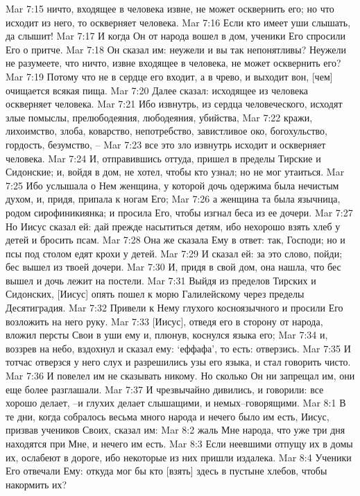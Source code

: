 Mar 7:15  ничто, входящее в человека извне, не может осквернить его; но что исходит из него, то оскверняет человека.
Mar 7:16  Если кто имеет уши слышать, да слышит!
Mar 7:17  И когда Он от народа вошел в дом, ученики Его спросили Его о притче.
Mar 7:18  Он сказал им: неужели и вы так непонятливы? Неужели не разумеете, что ничто, извне входящее в человека, не может осквернить его?
Mar 7:19  Потому что не в сердце его входит, а в чрево, и выходит вон, [чем] очищается всякая пища.
Mar 7:20  Далее сказал: исходящее из человека оскверняет человека.
Mar 7:21  Ибо извнутрь, из сердца человеческого, исходят злые помыслы, прелюбодеяния, любодеяния, убийства,
Mar 7:22  кражи, лихоимство, злоба, коварство, непотребство, завистливое око, богохульство, гордость, безумство, --
Mar 7:23  все это зло извнутрь исходит и оскверняет человека.
Mar 7:24  И, отправившись оттуда, пришел в пределы Тирские и Сидонские; и, войдя в дом, не хотел, чтобы кто узнал; но не мог утаиться.
Mar 7:25  Ибо услышала о Нем женщина, у которой дочь одержима была нечистым духом, и, придя, припала к ногам Его;
Mar 7:26  а женщина та была язычница, родом сирофиникиянка; и просила Его, чтобы изгнал беса из ее дочери.
Mar 7:27  Но Иисус сказал ей: дай прежде насытиться детям, ибо нехорошо взять хлеб у детей и бросить псам.
Mar 7:28  Она же сказала Ему в ответ: так, Господи; но и псы под столом едят крохи у детей.
Mar 7:29  И сказал ей: за это слово, пойди; бес вышел из твоей дочери.
Mar 7:30  И, придя в свой дом, она нашла, что бес вышел и дочь лежит на постели.
Mar 7:31  Выйдя из пределов Тирских и Сидонских, [Иисус] опять пошел к морю Галилейскому через пределы Десятиградия.
Mar 7:32  Привели к Нему глухого косноязычного и просили Его возложить на него руку.
Mar 7:33  [Иисус], отведя его в сторону от народа, вложил персты Свои в уши ему и, плюнув, коснулся языка его;
Mar 7:34  и, воззрев на небо, вздохнул и сказал ему: `еффафа', то есть: отверзись.
Mar 7:35  И тотчас отверзся у него слух и разрешились узы его языка, и стал говорить чисто.
Mar 7:36  И повелел им не сказывать никому. Но сколько Он ни запрещал им, они еще более разглашали.
Mar 7:37  И чрезвычайно дивились, и говорили: все хорошо делает, --и глухих делает слышащими, и немых--говорящими.
Mar 8:1  В те дни, когда собралось весьма много народа и нечего было им есть, Иисус, призвав учеников Своих, сказал им:
Mar 8:2  жаль Мне народа, что уже три дня находятся при Мне, и нечего им есть.
Mar 8:3  Если неевшими отпущу их в домы их, ослабеют в дороге, ибо некоторые из них пришли издалека.
Mar 8:4  Ученики Его отвечали Ему: откуда мог бы кто [взять] здесь в пустыне хлебов, чтобы накормить их?

